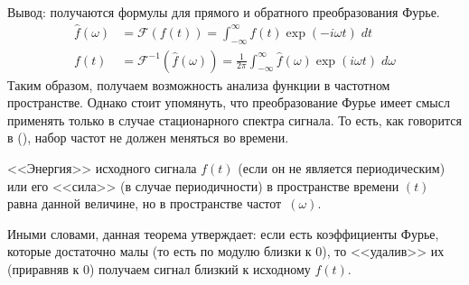 Вывод: получаются формулы для прямого и обратного преобразования Фурье.
\begin{equation}
	\begin{split}
		\hat{f}(\omega) & = \mathcal{F}(f(t)) = \int_{-\infty}^{\infty} f(t) \exp(-i \omega t) \; dt\\
		f(t) & = \mathcal{F}^{-1}(\hat{f}(\omega)) = \frac{1}{2 \pi} \int_{-\infty}^{\infty} \hat{f}(\omega) \exp(i \omega t) \; d\omega
	\end{split}
\end{equation}
Таким образом, получаем возможность анализа функции в частотном пространстве. Однако стоит упомянуть, что преобразование Фурье имеет смысл применять только в случае стационарного спектра сигнала. То есть, как говорится в (), набор частот не должен меняться во времени. 

\begin{theorem} \label{thm::parceval}
	<<Энергия>> исходного сигнала $f(t)$ (если он не является периодическим) или его <<сила>> (в случае периодичности) в пространстве времени $(t)$ равна данной величине, но в пространстве частот~$(\omega)$. 
\end{theorem}
Иными словами, данная теорема утверждает: если есть коэффициенты Фурье, которые достаточно малы (то есть по модулю близки к $0$), то <<удалив>> их (приравняв к $0$) получаем сигнал близкий к исходному $f(t)$.